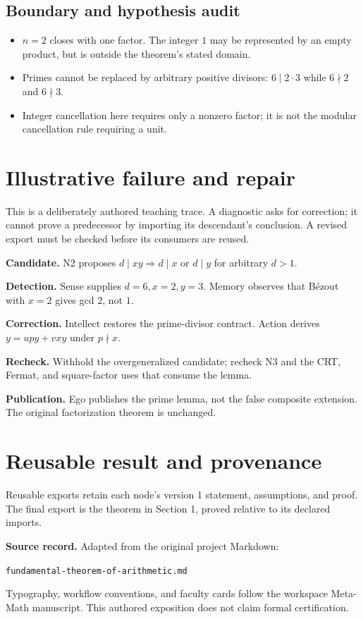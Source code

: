 \documentclass[preprint,12pt,aps,pra,showkeys,amsmath,amssymb,superscriptaddress,floatfix]{revtex4-2}
\theoremstyle{definition}
\theoremstyle{remark}
\newcommand{\field}[2]{\par\smallskip\noindent\textbf{#1.} #2\par}
\begin{document}
\subsection{Boundary and hypothesis audit}

\begin{itemize}
\item
  \(n=2\) closes with one factor. The integer \(1\) may be represented
  by an empty product, but is outside the theorem's stated domain.
\item
  Primes cannot be replaced by arbitrary positive divisors:
  \(6\mid2\cdot3\) while \(6\nmid2\) and \(6\nmid3\).
\item
  Integer cancellation here requires only a nonzero factor; it is not
  the modular cancellation rule requiring a unit.
\end{itemize}

\section{Illustrative failure and repair}

This is a deliberately authored teaching trace. A diagnostic asks for
correction; it cannot prove a predecessor by importing its descendant's
conclusion. A revised export must be checked before its consumers are
reused.

\field{Candidate}{N2 proposes \(d\mid xy\Rightarrow d\mid x\) or \(d\mid y\) for arbitrary
\(d>1\).}

\field{Detection}{Sense supplies \(d=6,x=2,y=3\). Memory observes that Bézout with \(x=2\)
gives gcd \(2\), not \(1\).}

\field{Correction}{Intellect restores the prime-divisor contract. Action derives
\(y=upy+vxy\) under \(p\nmid x\).}

\field{Recheck}{Withhold the overgeneralized candidate; recheck N3 and the CRT, Fermat,
and square-factor uses that consume the lemma.}

\field{Publication}{Ego publishes the prime lemma, not the false composite extension. The
original factorization theorem is unchanged.}

\section{Reusable result and provenance}
Reusable exports retain each node's version 1 statement, assumptions, and proof.
The final export is the theorem in Section 1, proved relative to its declared imports.

\smallskip\noindent\textbf{Source record.} Adapted from the original project Markdown:
\par\noindent\nolinkurl{fundamental-theorem-of-arithmetic.md}\par
Typography, workflow conventions, and faculty cards follow the workspace Meta-Math
manuscript. This authored exposition does not claim formal certification.
\end{document}
